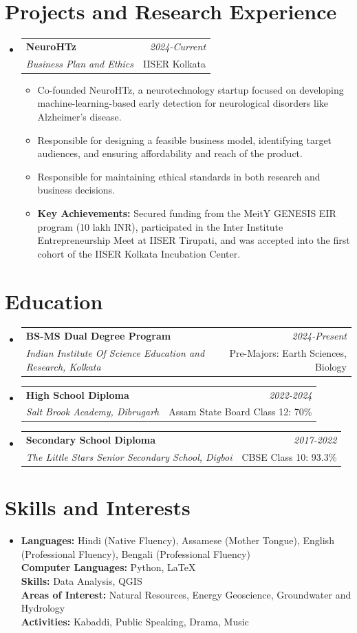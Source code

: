 \documentclass[a4paper,11pt]{article}
\makeatletter
\newcommand{\resumeSubheading}[4]{
\vspace{0.5mm}\item
    \begin{tabular*}{0.98\textwidth}[t]{l@{\extracolsep{\fill}}r}
        \textbf{#1} & \textit{\footnotesize{#4}} \\
        \textit{\footnotesize{#3}} &  \footnotesize{#2}\\
    \end{tabular*}
    \vspace{-2.4mm}
}
\newcommand{\resumeProject}[4]{
\vspace{0.5mm}\item
    \begin{tabular*}{0.98\textwidth}[t]{l@{\extracolsep{\fill}}r}
        \textbf{#1} & \textit{\footnotesize{#3}} \\
        \footnotesize{\textit{#2}} & \footnotesize{#4}
    \end{tabular*}
    \vspace{-2.4mm}
}
\newcommand{\resumeSubHeadingListStart}{\begin{itemize}[leftmargin=*,labelsep=0mm]}
\newcommand{\resumeItemListStart}{\begin{justify}\begin{itemize}[leftmargin=3ex, rightmargin=2ex, noitemsep,labelsep=1.2mm,itemsep=0mm]\small}
\newcommand{\resumeSubHeadingListEnd}{\end{itemize}\vspace{2mm}}
\newcommand{\resumeItemListEnd}{\end{itemize}\end{justify}\vspace{-2mm}}
\makeatother
\begin{document}
\section{\textbf{Projects and Research Experience}}
\resumeSubHeadingListStart
\resumeProject
  {NeuroHTz}
  {Business Plan and Ethics}
  {2024-Current}
  {IISER Kolkata}
\resumeItemListStart
  \item Co-founded NeuroHTz, a neurotechnology startup focused on developing machine-learning-based early detection for neurological disorders like Alzheimer's disease.
  \item Responsible for designing a feasible business model, identifying target audiences, and ensuring affordability and reach of the product.
  \item Responsible for maintaining ethical standards in both research and business decisions.
  \item \textbf{Key Achievements:} Secured funding from the MeitY GENESIS EIR program (10 lakh INR), participated in the Inter Institute Entrepreneurship Meet at IISER Tirupati, and was accepted into the first cohort of the IISER Kolkata Incubation Center.
\resumeItemListEnd
\resumeSubHeadingListEnd
\vspace{-4mm}


\section{\textbf{Education}}
  \resumeSubHeadingListStart
    \resumeSubheading
      {BS-MS Dual Degree Program}{Pre-Majors: Earth Sciences, Biology}
      {Indian Institute Of Science Education and Research, Kolkata}{2024-Present}
    \resumeSubheading
      {High School Diploma}{Assam State Board Class 12: 70\%}
      {Salt Brook Academy, Dibrugarh}{2022-2024}
    \resumeSubheading{Secondary School Diploma}{CBSE Class 10: 93.3\%}{The Little Stars Senior Secondary School, Digboi}{2017-2022}
  \resumeSubHeadingListEnd
\vspace{-5.5mm}

\section{\textbf{Skills and Interests}}
 \begin{itemize}[leftmargin=0.05in, label={}]
    \item{
     \textbf{Languages:}{ Hindi (Native Fluency), Assamese (Mother Tongue), English (Professional Fluency), Bengali (Professional Fluency)} \\
     \textbf{Computer Languages:}{ Python, LaTeX} \\
     \textbf{Skills:}{ Data Analysis, QGIS} \\
     \textbf{Areas of Interest:}{ Natural Resources, Energy Geoscience, Groundwater and Hydrology} \\
     \textbf{Activities:}{ Kabaddi, Public Speaking, Drama, Music}}
\end{itemize}
\end{document}
